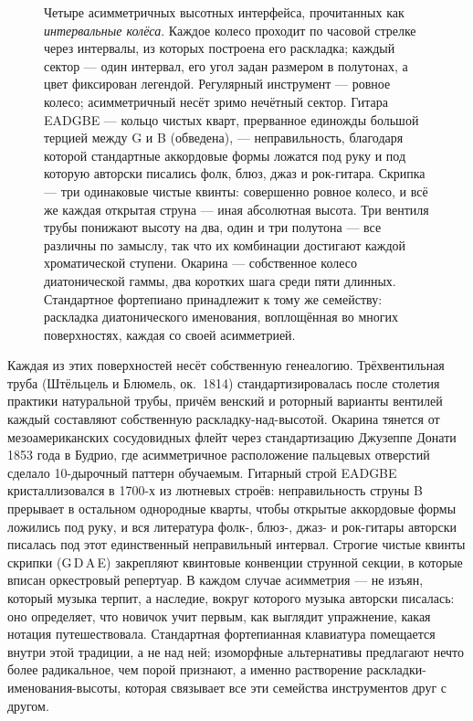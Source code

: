 \documentclass[10pt,letterpaper,twocolumn]{article}
\begin{document}
\begin{figure}[t]
{}
\endgroup
\caption{Четыре асимметричных высотных интерфейса, прочитанных как \emph{интервальные колёса}. Каждое колесо проходит по часовой стрелке через интервалы, из которых построена его раскладка; каждый сектор --- один интервал, его угол задан размером в полутонах, а цвет фиксирован легендой. Регулярный инструмент --- ровное колесо; асимметричный несёт зримо нечётный сектор. Гитара EADGBE --- кольцо чистых кварт, прерванное единожды большой терцией между G и B (обведена), --- неправильность, благодаря которой стандартные аккордовые формы ложатся под руку и под которую авторски писались фолк, блюз, джаз и рок-гитара. Скрипка --- три одинаковые чистые квинты: совершенно ровное колесо, и всё же каждая открытая струна --- иная абсолютная высота. Три вентиля трубы понижают высоту на два, один и три полутона --- все различны по замыслу, так что их комбинации достигают каждой хроматической ступени. Окарина --- собственное колесо диатонической гаммы, два коротких шага среди пяти длинных. Стандартное фортепиано принадлежит к тому же семейству: раскладка диатонического именования, воплощённая во многих поверхностях, каждая со своей асимметрией.}
\label{fig:asymmetric-instruments}
\end{figure}

Каждая из этих поверхностей несёт собственную генеалогию. Трёхвентильная труба (Штёльцель и Блюмель, ок.\ 1814) стандартизировалась после столетия практики натуральной трубы, причём венский и роторный варианты вентилей каждый составляют собственную раскладку-над-высотой. Окарина тянется от мезоамериканских сосудовидных флейт через стандартизацию Джузеппе Донати 1853 года в Будрио, где асимметричное расположение пальцевых отверстий сделало 10-дырочный паттерн обучаемым. Гитарный строй EADGBE кристаллизовался в 1700-х из лютневых строёв: неправильность струны B прерывает в остальном однородные кварты, чтобы открытые аккордовые формы ложились под руку, и вся литература фолк-, блюз-, джаз- и рок-гитары авторски писалась под этот единственный неправильный интервал. Строгие чистые квинты скрипки (G\,D\,A\,E) закрепляют квинтовые конвенции струнной секции, в которые вписан оркестровый репертуар. В каждом случае асимметрия --- не изъян, который музыка терпит, а наследие, вокруг которого музыка авторски писалась: оно определяет, что новичок учит первым, как выглядит упражнение, какая нотация путешествовала. Стандартная фортепианная клавиатура помещается внутри этой традиции, а не над ней; изоморфные альтернативы предлагают нечто более радикальное, чем порой признают, а именно растворение раскладки-именования-высоты, которая связывает все эти семейства инструментов друг с другом.
\end{document}
